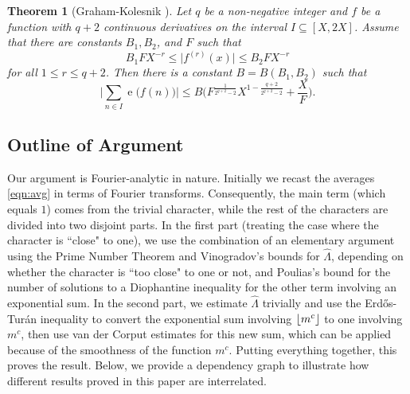 \documentclass[letterpaper, 12pt]{article}
\theoremstyle{plain}
\newtheorem{Theorem}{Theorem}
\theoremstyle{definition}
\theoremstyle{plain}
\theoremstyle{plain}
\numberwithin{equation}{section}
\newcommand{\Erdos}{Erd\H{o}s}
\newcommand{\Turan}{Tur{\'a}n}
\renewcommand{\leq}{\leqslant}
\newcommand{\1}{\textbf{1}}
\DeclarePairedDelimiter\floor{\lfloor}{\rfloor}
\DeclareMathOperator{\e}{e}
\begin{document}
\begin{Theorem}[Graham-Kolesnik ]\label{thm:vdc-estimate}
    Let $q$ be a non-negative integer and $f$ be a function with $q + 2$ continuous derivatives on the interval $I \subseteq [X, 2X]$. Assume that there are constants $B_1, B_2$, and $F$ such that 
    \begin{equation}\label{eqn:derv-bound}
        B_1 F X^{-r} \leq \lvert f^{(r)}(x)\rvert \leq B_2 F X^{-r}
    \end{equation} 
    for all $1 \leq r \leq q + 2$. Then there is a constant $B = B(B_1,B_2)$ such that 
    \[
        \biggl\lvert \sum_{n \in I} \e\bigl(f(n) \bigr) \biggr\rvert 
        \leq B \biggl(F^\frac{1}{2^{q+2}-2}X^{1-\frac{q+2}{2^{q+2}-2}} + \frac{X}{F} \biggr).
    \]
\end{Theorem}

\subsection{Outline of Argument}\label{outline}

\hspace{20pt} Our argument is Fourier-analytic in nature. Initially we recast the averages \eqref{eqn:avg} in terms of Fourier transforms. Consequently, the main term (which equals $1$) comes from the trivial character, while the rest of the characters are divided into two disjoint parts. In the first part (treating the case where the character is ``close" to one), we use the combination of an elementary argument using the Prime Number Theorem and Vinogradov's bounds for $\hat{\Lambda}$, depending on whether the character is ``too close" to one or not, and Poulias's bound for the number of solutions to a Diophantine inequality for the other term involving an exponential sum. In the second part, we estimate $\hat{\Lambda}$ trivially and use the \Erdos-\Turan{} inequality to convert the exponential sum involving $\floor{m^c}$ to one involving $m^c$, then use van der Corput estimates for this new sum, which can be applied because of the smoothness of the function $m^c$. Putting everything together, this proves the result. Below, we provide a dependency graph to illustrate how different results proved in this paper are interrelated.

\begin{figure}[omitted: a diagram of this paper's results, not reproduced here]\label{fig:dependency-graph}\end{figure}
\end{document}
